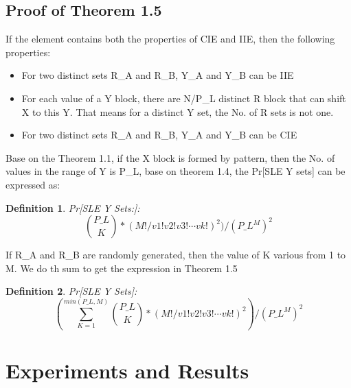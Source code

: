 \documentclass{article}
\newtheorem{defination}{Definition}[section]
\begin{document}
\subsection{Proof of Theorem 1.5}
If the element contains both the properties of CIE and IIE, then the following properties:
\begin{itemize}
	\item For two distinct sets R\_A and R\_B, Y\_A and Y\_B can be IIE
	\item For each value of a Y block, there are N/P\_L distinct R block that can shift X to this Y. That means for a distinct Y set, the No. of R sets is not one.
	\item For two distinct sets R\_A and R\_B, Y\_A and Y\_B can be CIE
\end{itemize}
Base on the Theorem 1.1, if the X block is formed by pattern, then the No. of values in the range of Y is P\_L, base on theorem 1.4, the Pr[SLE Y sets] can be expressed as:
\begin{defination}
Pr[SLE Y Sets:]:
\begin{displaymath}
\binom{P\_L}{K} * (M!/v1!v2!v3! \cdots vk!) ^ 2 )/(P\_L^M)^2
\end{displaymath}
\end{defination}

If R\_A and R\_B are randomly generated, then the value of K various from 1 to M. We do th sum to get the expression in Theorem 1.5
\begin{defination}
Pr[SLE Y Sets]:
\begin{displaymath}
(\sum_{K=1}^{min(P\_L,M)} \binom{P\_L}{K} * (M!/v1!v2!v3! \cdots vk!) ^ 2 )/(P\_L^M)^2
\end{displaymath}
\end{defination}


\section{Experiments and Results}
\end{document}
